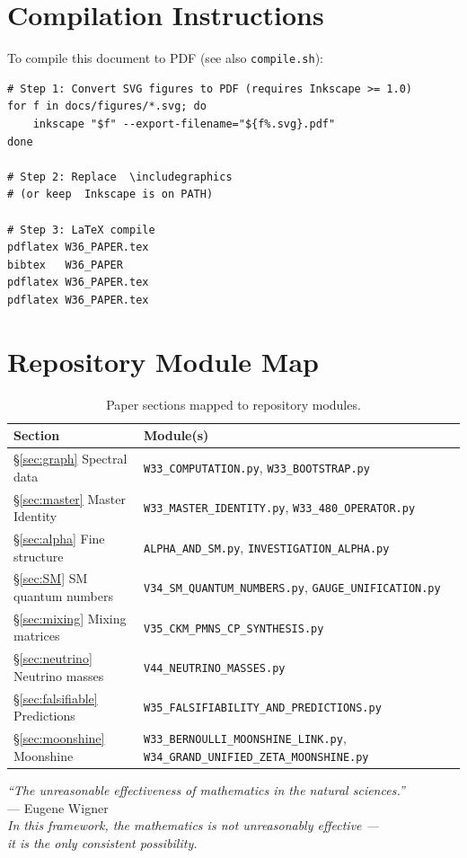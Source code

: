 \documentclass[12pt,a4paper]{article}
\begin{document}
\section{Compilation Instructions}
\label{app:compile}

To compile this document to PDF (see also \texttt{compile.sh}):
\begin{verbatim}
# Step 1: Convert SVG figures to PDF (requires Inkscape >= 1.0)
for f in docs/figures/*.svg; do
    inkscape "$f" --export-filename="${f%.svg}.pdf"
done

# Step 2: Replace  \includegraphics
# (or keep  Inkscape is on PATH)

# Step 3: LaTeX compile
pdflatex W36_PAPER.tex
bibtex   W36_PAPER
pdflatex W36_PAPER.tex
pdflatex W36_PAPER.tex
\end{verbatim}

\section{Repository Module Map}
\label{app:modules}

\begin{table}[H]
\centering
\caption{Paper sections mapped to repository modules.}
\renewcommand{\arraystretch}{1.2}
\begin{tabular}{@{}lll@{}}
\toprule
Section & Module(s) \\
\midrule
\S\ref{sec:graph} Spectral data
  & \texttt{W33\_COMPUTATION.py},
    \texttt{W33\_BOOTSTRAP.py} \\
\S\ref{sec:master} Master Identity
  & \texttt{W33\_MASTER\_IDENTITY.py},
    \texttt{W33\_480\_OPERATOR.py} \\
\S\ref{sec:alpha} Fine structure
  & \texttt{ALPHA\_AND\_SM.py},
    \texttt{INVESTIGATION\_ALPHA.py} \\
\S\ref{sec:SM} SM quantum numbers
  & \texttt{V34\_SM\_QUANTUM\_NUMBERS.py},
    \texttt{GAUGE\_UNIFICATION.py} \\
\S\ref{sec:mixing} Mixing matrices
  & \texttt{V35\_CKM\_PMNS\_CP\_SYNTHESIS.py} \\
\S\ref{sec:neutrino} Neutrino masses
  & \texttt{V44\_NEUTRINO\_MASSES.py} \\
\S\ref{sec:falsifiable} Predictions
  & \texttt{W35\_FALSIFIABILITY\_AND\_PREDICTIONS.py} \\
\S\ref{sec:moonshine} Moonshine
  & \texttt{W33\_BERNOULLI\_MOONSHINE\_LINK.py},
    \texttt{W34\_GRAND\_UNIFIED\_ZETA\_MOONSHINE.py} \\
\bottomrule
\end{tabular}
\end{table}

\vspace{2em}
\begin{center}
\textit{``The unreasonable effectiveness of mathematics in the natural sciences.''}\\
--- Eugene Wigner\\
\vspace{0.5em}
\textit{In this framework, the mathematics is not unreasonably effective ---}\\
\textit{it is the only consistent possibility.}
\end{center}
\end{document}
